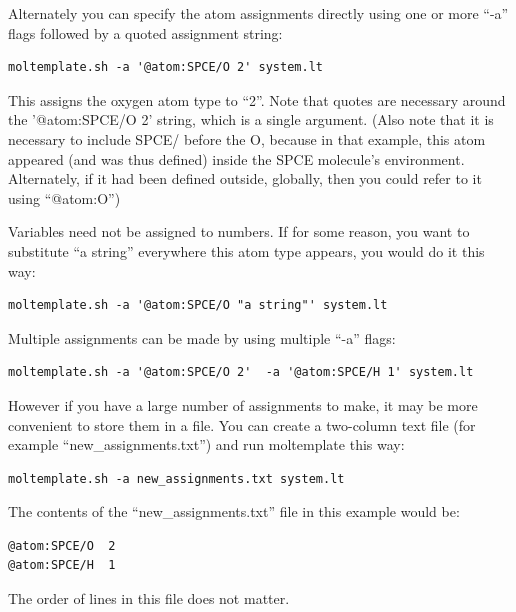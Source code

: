 \documentclass[11pt]{article}
\begin{document}
Alternately you can specify the atom assignments directly 
using one or more ``-a'' flags followed by a quoted assignment string:
\begin{verbatim}
moltemplate.sh -a '@atom:SPCE/O 2' system.lt
\end{verbatim}
This assigns the oxygen atom type to ``2''.
Note that quotes are necessary around the '@atom:SPCE/O 2' string, 
which is a single argument.
(Also note that it is necessary to include SPCE/ before 
 the O, 
 because in that example, 
 this atom
 appeared (and 
 was
 thus defined) inside the SPCE molecule's environment.
 Alternately, if 
 it
 had been defined outside, globally, 
 then you could refer to 
 it
 using 
 ``@atom:O'')

Variables need not be assigned to numbers.
If for some reason, you want to substitute ``a string'' everywhere 
this atom type appears, you would do it this way:
\begin{verbatim}
moltemplate.sh -a '@atom:SPCE/O "a string"' system.lt
\end{verbatim}

Multiple assignments can be made by using multiple ``-a'' flags:
\begin{verbatim}
moltemplate.sh -a '@atom:SPCE/O 2'  -a '@atom:SPCE/H 1' system.lt
\end{verbatim}
However if you have a large number of assignments to make, 
it may be more convenient to store them in a file.  
You can create a two-column text file (for example ``new\_assignments.txt'')
and run moltemplate this way:
\begin{verbatim}
moltemplate.sh -a new_assignments.txt system.lt
\end{verbatim}
The contents of the ``new\_assignments.txt'' file in this example would be:
\begin{verbatim}
@atom:SPCE/O  2
@atom:SPCE/H  1
\end{verbatim}
The order of lines in this file does not matter.


\end{document}

